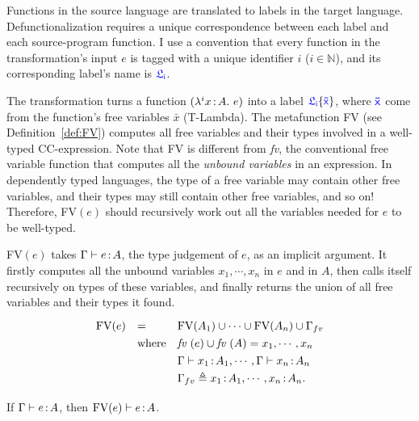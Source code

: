 Functions in the source language are translated to labels in the target language.
Defunctionalization requires a unique correspondence between each label and each source-program function.
I use a convention that every function in the transformation's input $e$ is tagged with a unique identifier $i$ ($i \in \mathbb{N}$), and its corresponding label's name is $\target{\flabel_i}$.

The transformation turns a function $(\lambda^{i}x\hspace{0.5mm}{:}\hspace{0.5mm} A.\ e)$ into a label $\targetlab{\flabel_i}{\bar{x}}$, where $\target{\bar{x}}$ come from the function's free variables $\bar{x}$ (T-Lambda). The metafunction FV (see Definition~\ref{def:FV}) computes all free variables and their types involved in a well-typed CC-expression. Note that FV is different from \textit{fv}, the conventional free variable function that computes all the \textit{unbound variables} in an expression. In dependently typed languages, the type of a free variable may contain other free variables, and their types may still contain other free variables, and so on! Therefore, FV$(e)$ should recursively work out all the variables needed for $e$ to be well-typed. 

\begin{definition}FV$(e)$ takes $\Gamma \vdash e \hspace{0.5mm}{:}\hspace{0.5mm} A$, the type judgement of $e$, as an implicit argument. It firstly computes all the unbound variables $x_1, \cdots, x_n$ in $e$ and in $A$, then calls itself recursively on types of these variables, and finally returns the union of all free variables and their types it found.
\begin{equation*}
\renewcommand{\arraystretch}{1.3}
\begin{array}{l l l}
	\text{FV}(e) & = & \text{FV}(A_1) \cup \cdots \cup \text{FV}(A_n) \cup \Gamma_{fv}\\
	& \text{where} & \textit{fv }(e) \cup \textit{fv }(A) = x_1, \cdots, x_n\\
	& & \Gamma \vdash x_1 \goodcolon A_1, \cdots, \Gamma \vdash x_n \goodcolon A_n\\
	& & \Gamma_{fv} \triangleq x_1 \goodcolon A_1, \cdots, x_n \goodcolon A_n.\\
\end{array}
\end{equation*}
\label{def:FV}
\end{definition}

\begin{lemma}If $\Gamma \vdash e \hspace{0.5mm}{:}\hspace{0.5mm} A$, then $\text{FV}(e) \vdash e \hspace{0.5mm}{:}\hspace{0.5mm} A$.
\label{lem:fv}
\end{lemma}

